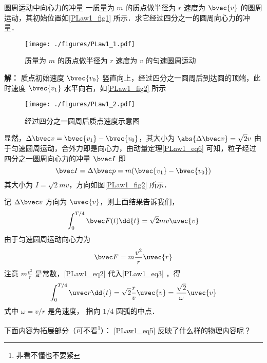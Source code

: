 \begin{example}{圆周运动中向心力的冲量}
一质量为 $m$ 的质点做半径为 $r$ 速度为 $\bvec{v}$ 的圆周运动，其初始位置如\autoref{PLaw1_fig1} 所示．求它经过四分之一的圆周向心力的冲量．
\begin{figure}[ht]
\centering
\texttt{[image: ./figures/PLaw1\_1.pdf]}
\caption{质量为 $m$ 的质点做半径为 $r$ 速度为 $v$ 的匀速圆周运动} \label{PLaw1_fig1}
\end{figure}
\textbf{解：} 质点初始速度 $\bvec{v_0}$ 竖直向上，经过四分之一圆周后到达圆的顶端，此时速度 $\bvec{v_1}$ 水平向右，如\autoref{PLaw1_fig2} 所示
\begin{figure}[ht]
\centering
\texttt{[image: ./figures/PLaw1\_2.pdf]}
\caption{经过四分之一圆周后质点速度示意图} \label{PLaw1_fig2}
\end{figure}
显然，$\Delta\bvec v=\bvec{v_1}-\bvec{v_0}$，其大小为 $\abs{\Delta\bvec v}=\sqrt{2}v$ 由于匀速圆周运动，合外力即是向心力，由动量定理\autoref{PLaw1_eq6}  可知，粒子经过四分之一圆周向心力的冲量 $\bvec I$ 即
\begin{equation}
\bvec I=\Delta\bvec p=m(\bvec{v_1}-\bvec{v_0})
\end{equation}
其大小为 $I=\sqrt{2}mv$，方向如图\autoref{PLaw1_fig2} 所示．

记 $\Delta\bvec v$ 方向为 $\uvec{v}$，则上面结果告诉我们，
\begin{equation}\label{PLaw1_eq3}
\int_{0}^{T/4}\bvec F(t) \dd{t}=\sqrt{2}mv\uvec{v}
\end{equation}
由于匀速圆周运动向心力为
\begin{equation}\label{PLaw1_eq2}
\bvec F=m\frac{v^2}{r}\uvec{r}
\end{equation}
注意 $m\frac{v^2}{r}$ 是常数，\autoref{PLaw1_eq2} 代入\autoref{PLaw1_eq3} ，得
\begin{equation}\label{PLaw1_eq5}
\int_{0}^{T/4}\uvec r \dd{t}=\sqrt{2}\frac{r}{v}\uvec{v}=\frac{\sqrt{2}}{\omega}\uvec{v}
\end{equation}
式中 $\omega={v}/{r}$ 是角速度， 指向 $1/4$ 圆弧的中点．

下面内容为拓展部分（可不看\footnote{非看不懂也不要紧}）：
\autoref{PLaw1_eq5} 反映了什么样的物理内容呢？


\end{example}
